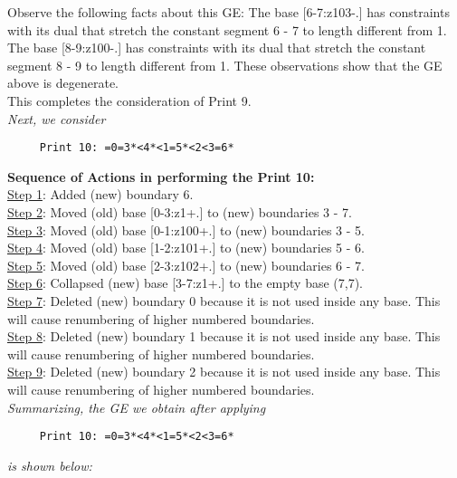 \documentclass[final]{article}
\begin{document}
Observe the following facts about this GE:
The base [6-7:z103-.]  has constraints with its dual that stretch the constant segment 6 - 7 to length different from 1.  The base [8-9:z100-.]  has constraints with its dual that stretch the constant segment 8 - 9 to length different from 1.  These observations show that the GE above is degenerate.\\[0.1in]
This completes the consideration of Print 9.\\[0.1in]
{\em Next, we consider}
\begin{verbatim}
     Print 10: =0=3*<4*<1=5*<2<3=6*
\end{verbatim}
{\bf Sequence of Actions in performing the Print 10:}\\
{\underline{Step 1}:} Added (new) boundary 6.\\
{\underline{Step 2}:} Moved (old) base [0-3:z1+.]  to (new) boundaries 3 - 7.\\
{\underline{Step 3}:} Moved (old) base [0-1:z100+.]  to (new) boundaries 3 - 5.\\
{\underline{Step 4}:} Moved (old) base [1-2:z101+.]  to (new) boundaries 5 - 6.\\
{\underline{Step 5}:} Moved (old) base [2-3:z102+.]  to (new) boundaries 6 - 7.\\
{\underline{Step 6}:} Collapsed (new) base [3-7:z1+.]  to the empty base (7,7).
\\
{\underline{Step 7}:} Deleted (new) boundary 0 because it is not used inside any base.  This will cause renumbering of higher numbered boundaries.
\\
{\underline{Step 8}:} Deleted (new) boundary 1 because it is not used inside any base.  This will cause renumbering of higher numbered boundaries.
\\
{\underline{Step 9}:} Deleted (new) boundary 2 because it is not used inside any base.  This will cause renumbering of higher numbered boundaries.
\\[0.1in]
{\em Summarizing, the GE we obtain after applying}
\begin{verbatim}
     Print 10: =0=3*<4*<1=5*<2<3=6*
\end{verbatim}
{\em is shown below:}
\end{document}
